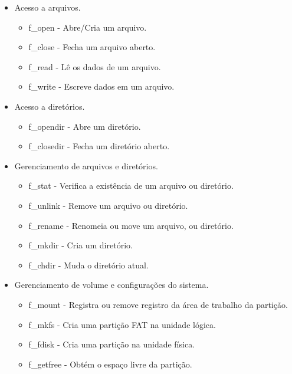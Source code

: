 \begin{itemize}
    \item Acesso a arquivos.
    \begin{itemize}
        \item f\_open - Abre/Cria um arquivo.
        \item f\_close - Fecha um arquivo aberto.
        \item f\_read - Lê os dados de um arquivo.
        \item f\_write - Escreve dados em um arquivo.
    \end{itemize}
    \item Acesso a diretórios.
    \begin{itemize}
        \item f\_opendir - Abre um diretório.
        \item f\_closedir - Fecha um diretório aberto.
    \end{itemize}
    \item Gerenciamento de arquivos e diretórios.
    \begin{itemize}
        \item f\_stat - Verifica a existência de um arquivo ou diretório.
        \item f\_unlink - Remove um arquivo ou diretório. 
        \item f\_rename - Renomeia ou move um arquivo, ou diretório.
        \item f\_mkdir - Cria um diretório.
        \item f\_chdir - Muda o diretório atual.
    \end{itemize}
    \item Gerenciamento de volume e configurações do sistema.
    \begin{itemize}
        \item f\_mount - Registra ou remove registro da área de trabalho da partição.
        \item f\_mkfs - Cria uma partição FAT na unidade lógica.
        \item f\_fdisk - Cria uma partição na unidade física.
        \item f\_getfree - Obtém o espaço livre da partição.
    \end{itemize}
\end{itemize}

